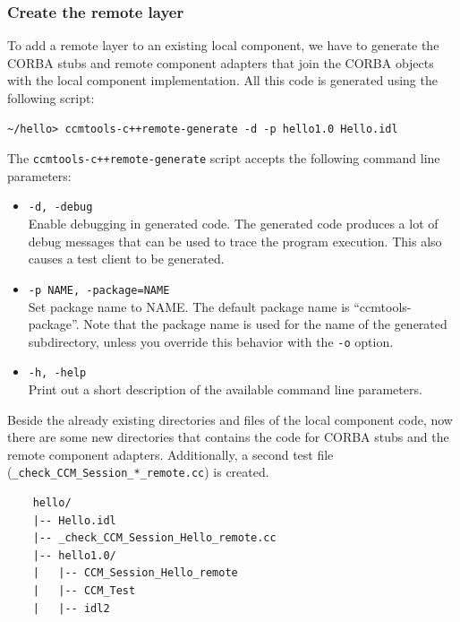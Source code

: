 \subsubsection{Create the remote layer}

To add a remote layer to an existing local component, we have to generate the
CORBA stubs and remote component adapters that join the CORBA objects with the
local component implementation.
All this code is generated using the following script:

\begin{small}
\begin{verbatim}
~/hello> ccmtools-c++remote-generate -d -p hello1.0 Hello.idl
\end{verbatim}
\end{small}
The {\tt ccmtools-c++remote-generate} script accepts the following command line
parameters:
\begin{itemize}
\item {\tt -d, -\-debug }\\
Enable debugging in generated code. The generated code produces a lot of debug
messages that can be used to trace the program execution. This also causes a
test client to be generated.

\item {\tt -p NAME, -\-package=NAME}\\
Set package name to NAME. The default package name is ``ccmtools-package''. Note
that the package name is used for the name of the generated subdirectory, unless
you override this behavior with the {\tt -o} option.

\item {\tt -h, -\-help}\\
Print out a short description of the available command line parameters.
\end{itemize}


\noindent
Beside the already existing directories and files of the local component code, 
now there are some new directories that contains the code for CORBA stubs and 
the remote component adapters.
Additionally, a second test file ({\tt \_check\_CCM\_Session\_*\_remote.cc}) is
created.

\begin{small}
\begin{verbatim}
    hello/
    |-- Hello.idl
    |-- _check_CCM_Session_Hello_remote.cc
    |-- hello1.0/
    |   |-- CCM_Session_Hello_remote
    |   |-- CCM_Test
    |   |-- idl2
\end{verbatim}
\end{small}

